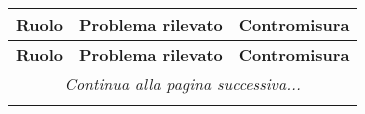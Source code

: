 \documentclass[../piano_di_qualifica.tex]{subfiles}
\begin{document}
\begin{center}
	\begin{longtable}{|p{2.5cm}|p{7cm}|p{7cm}|}
		\hline
		\rowcolor{lightgray}
		\textbf{Ruolo} & \textbf{Problema rilevato}                                                                                                                                                                                 & \textbf{Contromisura}                                                                                                                                                                                                                                                 \\
		\hline

		\endfirsthead

		\hline
		\rowcolor{lightgray}
		\textbf{Ruolo} & \textbf{Problema rilevato}                                                                                                                                                                                 & \textbf{Contromisura}                                                                                                                                                                                                                                                 \\
		\hline
		\endhead

		\hline
		\multicolumn{3}{|c|}{\emph{Continua alla pagina successiva...}}                                                                                                                                                                                                                                                                                                                                                                                                                                     \\
		\hline
		\endfoot

		\endlastfoot


\end{longtable}
\end{center}
\end{document}
